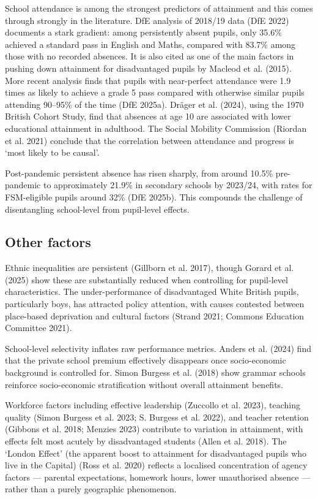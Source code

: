 \documentclass[
  12pt,
  titlepage]{article}
\begin{document}
School attendance is among the strongest predictors of attainment and
this comes through strongly in the literature. DfE analysis of 2018/19
data (DfE 2022) documents a stark gradient: among persistently absent
pupils, only 35.6\% achieved a standard pass in English and Maths,
compared with 83.7\% among those with no recorded absences. It is also
cited as one of the main factors in pushing down attainment for
disadvantaged pupils by Macleod et al. (2015). More recent analysis
finds that pupils with near-perfect attendance were 1.9 times as likely
to achieve a grade 5 pass compared with otherwise similar pupils
attending 90--95\% of the time (DfE 2025a). Dräger et al. (2024), using
the 1970 British Cohort Study, find that absences at age 10 are
associated with lower educational attainment in adulthood. The Social
Mobility Commission (Riordan et al. 2021) conclude that the correlation
between attendance and progress is `most likely to be causal'.

Post-pandemic persistent absence has risen sharply, from around 10.5\%
pre-pandemic to approximately 21.9\% in secondary schools by 2023/24,
with rates for FSM-eligible pupils around 32\% (DfE 2025b). This
compounds the challenge of disentangling school-level from pupil-level
effects.

\subsection{Other factors}\label{other-factors}

Ethnic inequalities are persistent (Gillborn et al. 2017), though Gorard
et al. (2025) show these are substantially reduced when controlling for
pupil-level characteristics. The under-performance of disadvantaged
White British pupils, particularly boys, has attracted policy attention,
with causes contested between place-based deprivation and cultural
factors (Strand 2021; Commons Education Committee 2021).

School-level selectivity inflates raw performance metrics. Anders et al.
(2024) find that the private school premium effectively disappears once
socio-economic background is controlled for. Simon Burgess et al. (2018)
show grammar schools reinforce socio-economic stratification without
overall attainment benefits.

Workforce factors including effective leadership (Zuccollo et al. 2023),
teaching quality (Simon Burgess et al. 2023; S. Burgess et al. 2022),
and teacher retention (Gibbons et al. 2018; Menzies 2023) contribute to
variation in attainment, with effects felt most acutely by disadvantaged
students (Allen et al. 2018). The `London Effect' (the apparent boost to
attainment for disadvantaged pupils who live in the Capital) (Ross et
al. 2020) reflects a localised concentration of agency factors ---
parental expectations, homework hours, lower unauthorised absence ---
rather than a purely geographic phenomenon.
\end{document}
